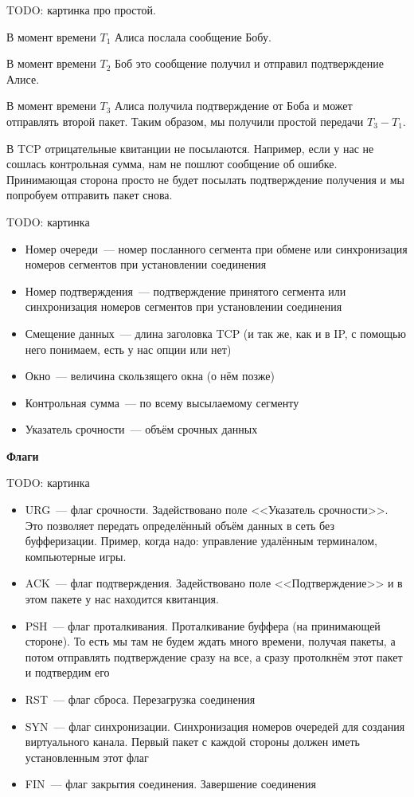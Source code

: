 TODO: картинка про простой.

В момент времени $T_1$ Алиса послала сообщение Бобу.

В момент времени $T_2$ Боб это сообщение получил и отправил подтверждение Алисе.

В момент времени $T_3$ Алиса получила подтверждение от Боба и может отправлять второй пакет. Таким образом, мы получили простой передачи $T_3-T_1$.

В TCP отрицательные квитанции не посылаются. Например, если у нас не сошлась контрольная сумма, нам не пошлют сообщение об ошибке. Принимающая сторона просто не будет посылать подтверждение получения и мы попробуем отправить пакет снова.


TODO: картинка

\begin{itemize}
    \item Номер очереди~--- номер посланного сегмента при обмене или синхронизация номеров сегментов при установлении соединения
    \item Номер подтверждения~--- подтверждение принятого сегмента или синхронизация номеров сегментов при установлении соединения
    \item Смещение данных~--- длина заголовка TCP (и так же, как и в IP, с помощью него понимаем, есть у нас опции или нет)
    \item Окно~--- величина скользящего окна (о нём позже)
    \item Контрольная сумма~--- по всему высылаемому сегменту
    \item Указатель срочности~--- объём срочных данных

\end{itemize}

{\bf Флаги}

TODO: картинка

\begin{itemize}
    \item URG~--- флаг срочности. Задействовано поле <<Указатель срочности>>. Это позволяет передать определённый объём данных в сеть без буфферизации. Пример, когда надо: управление удалённым терминалом, компьютерные игры.
    \item ACK~--- флаг подтверждения. Задействовано поле <<Подтверждение>> и в этом пакете у нас находится квитанция.
    \item PSH~--- флаг проталкивания. Проталкивание буффера (на принимающей стороне). То есть мы там не будем ждать много времени, получая пакеты, а потом отправлять подтверждение сразу на все, а сразу протолкнём этот пакет и подтвердим его
    \item RST~--- флаг сброса. Перезагрузка соединения
    \item SYN~--- флаг синхронизации. Синхронизация номеров очередей для создания виртуального канала. Первый пакет с каждой стороны должен иметь установленным этот флаг
    \item FIN~--- флаг закрытия соединения. Завершение соединения
\end{itemize}

